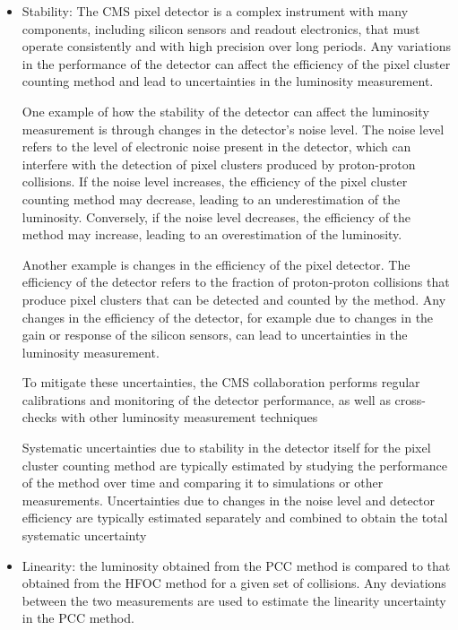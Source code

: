 \begin{itemize}

\item Stability: The CMS pixel detector is a complex instrument with many components, including silicon sensors and readout electronics, that must operate consistently and with high precision over long periods. Any variations in the performance of the detector can affect the efficiency of the pixel cluster counting method and lead to uncertainties in the luminosity measurement.

  One example of how the stability of the detector can affect the luminosity measurement is through changes in the detector's noise level. The noise level refers to the level of electronic noise present in the detector, which can interfere with the detection of pixel clusters produced by proton-proton collisions. If the noise level increases, the efficiency of the pixel cluster counting method may decrease, leading to an underestimation of the luminosity. Conversely, if the noise level decreases, the efficiency of the method may increase, leading to an overestimation of the luminosity.

  Another example is changes in the efficiency of the pixel detector. The efficiency of the detector refers to the fraction of proton-proton collisions that produce pixel clusters that can be detected and counted by the method. Any changes in the efficiency of the detector, for example due to changes in the gain or response of the silicon sensors, can lead to uncertainties in the luminosity measurement.

  To mitigate these uncertainties, the CMS collaboration performs regular calibrations and monitoring of the detector performance, as well as cross-checks with other luminosity measurement techniques

  Systematic uncertainties due to stability in the detector itself for the pixel cluster counting method are typically estimated by studying the performance of the method over time and comparing it to simulations or other measurements. Uncertainties due to changes in the noise level and detector efficiency are typically estimated separately and combined to obtain the total systematic uncertainty

\item Linearity: the luminosity obtained from the PCC method is compared to that obtained from the HFOC method for a given set of collisions. Any deviations between the two measurements are used to estimate the linearity uncertainty in the PCC method.


\end{itemize}
